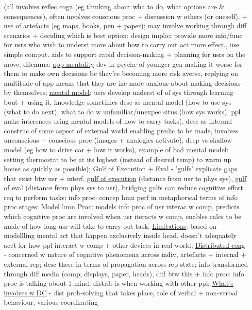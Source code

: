 \documentclass[a4paper]{article}
\begin{document}
\begin{multicols}{3}
        (all involves reflec cogn (eg thinking about wha to do, what options are \& consequences), often involves conscious proc + discussion w others (or oneself), + use of artefacts (eg maps, books, pen +
        paper); may involve working through diff scenarios + deciding which is best option; design implic: provide more info/func for usrs who wish to underst more about how to carry out act more effect.,
        use simple comput. aids to support rapid decision-making + planning for usrs on the move; dilemma: \underline{app mentality} dev in psyche of younger gen making it worse for them to make own decisions bc they're
        becoming more risk averse, replying on multitude of app means that they are inc more anxious about making decisions by themselves; \underline{mental model}: usrs develop underst of of sys through learning
        bout + using it, knowledge sometimes desc as mental model (how to use sys (what to do next), what to do w unfamiliar/unexpec situs (how sys works), ppl make interences using mental
        models of how to carry tasks), desc as internal construc of some aspect of external world enabling predic to be made, involves unconscious + conscious proc (images + analogies activate),
        deep vs shallow model (eg how to drive car + how it works), example of bad mental model: setting thermostat to be at its highest (instead of desired temp) to warm up house as quickly as possible);
        \underline{Gulf of Execution + Eval} - 'gulfs' explicate gaps that exist btw usr + interf, \underline{gulf of execution} (distance from usr to phys sys), \underline{gulf of eval} (distance from phys sys to usr),
        bridging gulfs can reduce cognitive effort req to perform tasks; info proc: concep hmn perf in metaphorical terms of info proc stages; \underline{Model hmn Proc}: models info proc of usr interac w comp,
        predicts which cognitive proc are involved when usr iteracts w comp, enables calcs to be made of how long usr will take to carry out task; \underline{Limitations}: based on modellling mental act that
        happen exclusively inside head, doesn't adequately acct for how ppl interact w comp + other devices in real world; \underline{Distributed cong} - concerned w nature of cognitive phenomena across
        indiv, artefacts + internal + external rep; desc these in terms of propagation across rep state; info transformed through diff media (comp, displays, paper, heads), diff btw this + info proc: info
        proc is talking about 1 mind, distrib is when working with other ppl; \underline{What's involves w DC} - dist prob-solving that takes place, role of verbal + non-verbal behaviour, various coordinating

\end{multicols}
\end{document}
